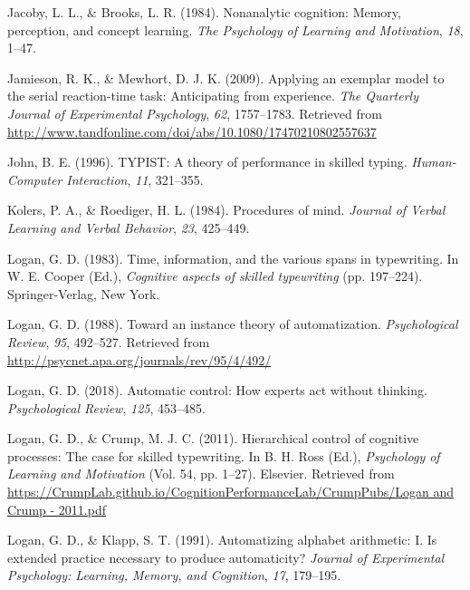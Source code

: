 \documentclass[,man,floatsintext]{apa6}
\begin{document}
\leavevmode\hypertarget{ref-JacobyNonanalyticcognitionMemory1984}{}%
Jacoby, L. L., \& Brooks, L. R. (1984). Nonanalytic cognition: Memory, perception, and concept learning. \emph{The Psychology of Learning and Motivation}, \emph{18}, 1--47.

\leavevmode\hypertarget{ref-jamieson_applying_2009}{}%
Jamieson, R. K., \& Mewhort, D. J. K. (2009). Applying an exemplar model to the serial reaction-time task: Anticipating from experience. \emph{The Quarterly Journal of Experimental Psychology}, \emph{62}, 1757--1783. Retrieved from \url{http://www.tandfonline.com/doi/abs/10.1080/17470210802557637}

\leavevmode\hypertarget{ref-john_typist:_1996}{}%
John, B. E. (1996). TYPIST: A theory of performance in skilled typing. \emph{Human-Computer Interaction}, \emph{11}, 321--355.

\leavevmode\hypertarget{ref-KolersProceduresmind1984}{}%
Kolers, P. A., \& Roediger, H. L. (1984). Procedures of mind. \emph{Journal of Verbal Learning and Verbal Behavior}, \emph{23}, 425--449.

\leavevmode\hypertarget{ref-logan_span_1983}{}%
Logan, G. D. (1983). Time, information, and the various spans in typewriting. In W. E. Cooper (Ed.), \emph{Cognitive aspects of skilled typewriting} (pp. 197--224). Springer-Verlag, New York.

\leavevmode\hypertarget{ref-logan_toward_1988}{}%
Logan, G. D. (1988). Toward an instance theory of automatization. \emph{Psychological Review}, \emph{95}, 492--527. Retrieved from \url{http://psycnet.apa.org/journals/rev/95/4/492/}

\leavevmode\hypertarget{ref-logan_2018}{}%
Logan, G. D. (2018). Automatic control: How experts act without thinking. \emph{Psychological Review}, \emph{125}, 453--485.

\leavevmode\hypertarget{ref-logan_hierarchical_2011}{}%
Logan, G. D., \& Crump, M. J. C. (2011). Hierarchical control of cognitive processes: The case for skilled typewriting. In B. H. Ross (Ed.), \emph{Psychology of Learning and Motivation} (Vol. 54, pp. 1--27). Elsevier. Retrieved from \href{https://CrumpLab.github.io/CognitionPerformanceLab/CrumpPubs/Logan\%20and\%20Crump\%20-\%202011.pdf}{https://CrumpLab.github.io/CognitionPerformanceLab/CrumpPubs/Logan and Crump - 2011.pdf}

\leavevmode\hypertarget{ref-logan_automatizing_1991}{}%
Logan, G. D., \& Klapp, S. T. (1991). Automatizing alphabet arithmetic: I. Is extended practice necessary to produce automaticity? \emph{Journal of Experimental Psychology: Learning, Memory, and Cognition}, \emph{17}, 179--195.
\end{document}
